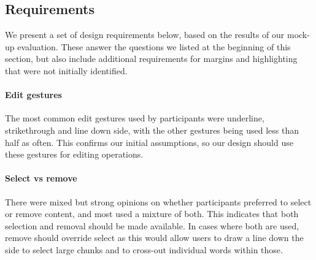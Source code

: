 

\subsection{Requirements}

We present a set of design requirements below, based on the results of our mock-up evaluation.  These answer the
questions we listed at the beginning of this section, but also include additional requirements for margins and
highlighting that were not initially identified.

\paragraph{Edit gestures}
The most common edit gestures used by participants were underline, strikethrough and line down side, with the other
gestures being used less than half as often.  This confirms our initial assumptions, so our design should use these
gestures for editing operations.

\paragraph{Select vs remove}
There were mixed but strong opinions on whether participants preferred to select or remove content, and most used a
mixture of both.  This indicates that both selection and removal should be made available. In cases where both are
used, remove should override select as this would allow users to draw a line down the side to select large chunks and 
to cross-out individual words within those.

